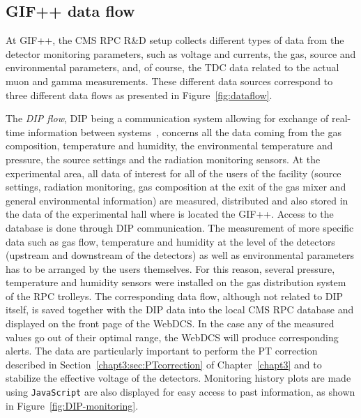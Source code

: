	\subsection{GIF++ data flow}
	\label{chapt5:ssec:dataflow}
	
	At GIF++, the CMS RPC R\&D setup collects different types of data from the detector monitoring parameters, such as voltage and currents, the gas, source and environmental parameters, and, of course, the TDC data related to the actual muon and gamma measurements. These different data sources correspond to three different data flows as presented in Figure~\ref{fig:dataflow}.
	
	The \textit{\acf{DIP} flow}, DIP being a communication system allowing for exchange of real-time information between systems~\cite{DIP}, concerns all the data coming from the gas composition, temperature and humidity, the environmental temperature and pressure, the source settings and the radiation monitoring sensors. At the experimental area, all data of interest for all of the users of the facility (source settings, radiation monitoring, gas composition at the exit of the gas mixer and general environmental information) are measured, distributed and also stored in the data of the experimental hall where is located the GIF++. Access to the database is done through DIP communication. The measurement of more specific data such as gas flow, temperature and humidity at the level of the detectors (upstream and downstream of the detectors) as well as environmental parameters has to be arranged by the users themselves. For this reason, several pressure, temperature and humidity sensors were installed on the gas distribution system of the RPC trolleys. The corresponding data flow, although not related to DIP itself, is saved together with the DIP data into the local CMS RPC database and displayed on the front page of the WebDCS. In the case any of the measured values go out of their optimal range, the WebDCS will produce corresponding alerts. The data are particularly important to perform the PT correction described in Section~\ref{chapt3:sec:PTcorrection} of Chapter~\ref{chapt3} and to stabilize the effective voltage of the detectors. Monitoring history plots are made using \texttt{JavaScript} are also displayed for easy access to past information, as shown in Figure~\ref{fig:DIP-monitoring}.

